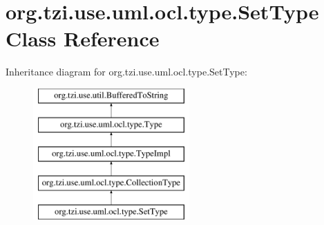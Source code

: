 \hypertarget{classorg_1_1tzi_1_1use_1_1uml_1_1ocl_1_1type_1_1_set_type}{\section{org.\-tzi.\-use.\-uml.\-ocl.\-type.\-Set\-Type Class Reference}
\label{classorg_1_1tzi_1_1use_1_1uml_1_1ocl_1_1type_1_1_set_type}
}
Inheritance diagram for org.\-tzi.\-use.\-uml.\-ocl.\-type.\-Set\-Type\-:\begin{figure}[H]
\begin{center}
\leavevmode
\includegraphics[height=5.000000cm]{classorg_1_1tzi_1_1use_1_1uml_1_1ocl_1_1type_1_1_set_type}
\end{center}
\end{figure}
